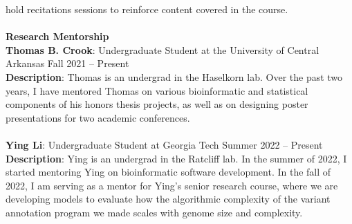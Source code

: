 \documentclass{article}
\begin{document}
hold recitations sessions to reinforce content covered in the course.\\
\\
\textbf{Research Mentorship}\\
\textbf{Thomas B. Crook}: Undergraduate Student at the University of Central Arkansas \hfill Fall 2021 – Present\\
\textbf{Description}: Thomas is an undergrad in the Haselkorn lab. Over the past two years, I have mentored Thomas
on various bioinformatic and statistical components of his honors thesis projects, as well as on designing poster 
presentations for two academic conferences.\\
\\
\textbf{Ying Li}: Undergraduate Student at Georgia Tech \hfill Summer 2022 – Present\\
\textbf{Description}: Ying is an undergrad in the Ratcliff lab. In the summer of 2022, I started 
mentoring Ying on bioinformatic software development. In the fall of 2022, I am serving as a 
mentor for Ying's senior research course, where we are developing models to evaluate how the 
algorithmic complexity of the variant annotation program we made scales with genome size and complexity.\\
\end{document}
